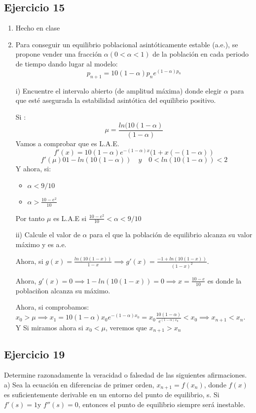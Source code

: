 \documentclass[11pt, a4paper, titlepage]{article}
\theoremstyle{theorem-style}
\theoremstyle{definition-style}
\theoremstyle{remark-style}
\theoremstyle{example-style}
\begin{document}
	\subsection{Ejercicio 15}
	
	\begin{enumerate}
	\item Hecho en clase
	\item Para conseguir un equilibrio poblacional asintóticamente estable (a.e.), se propone vender una fracción $\alpha$$(0 < \alpha < 1)$ de la población en cada periodo de tiempo dando lugar al modelo:
	\[
	p_{n+1} = 10(1 - \alpha)p_n e^{(1-\alpha)p_n}
	\]

	i) Encuentre el intervalo abierto (de amplitud máxima) donde elegir $\alpha$ para que esté asegurada la estabilidad
asintótica del equilibrio positivo.


	Si :
	\[
	\mu = \frac{ln(10(1-\alpha)}{(1-\alpha)}
	\]
Vamos a comprobar que es L.A.E.
\[
f'(x) = 10(1-\alpha)e^{-(1-\alpha)x}(1+x(-(1-\alpha))
\]
\[
f'(\mu) 0 1-ln(10(1-\alpha)) \quad y \quad 0 < ln(10(1-\alpha))< 2
\]
Y ahora, si:
\begin{itemize}
	\item $\alpha < 9/10$
	\item $\alpha > \frac{10-e^2}{10}$
\end{itemize}
Por tanto $\mu$ es L.A.E si $\frac{10-e^2}{10} < \alpha < 9/10$

ii) Calcule el valor de $\alpha$ para el que la población de equilibrio alcanza su valor máximo y es a.e.

Ahora, si $g(x) = \frac{ln(10(1-x))}{1-x}\implies g'(x)= \frac{-1+ln(10(1-x))}{(1-x)^2}$.

Ahora, $g'(x) = 0\implies 1-ln(10(1-x)) = 0 \implies x= \frac{10-e}{10}$ es donde la poblaciñon alcanza su máximo.

Ahora, si comprobamos: $x_0 > \mu \implies x_1 = 10(1-\alpha)x_0 e^{-(1-\alpha)x_0} = x_0 \frac{10(1-\alpha)}{e^{(1-\alpha)x_0}} < x_0 \implies x _{n+1} < x_n$. Y Si miramos ahora si $x_0 < \mu$, veremos que $x _{n+1} > x_n$
\end{enumerate}

\subsection{Ejercicio 19}

Determine razonadamente la veracidad o falsedad de las siguientes afirmaciones.
a) Sea la ecuación en diferencias de primer orden, $x _{n+1} = f (x_n )$, donde $f(x)$ es suficientemente derivable en
un entorno del punto de equilibrio, s. Si $f'(s) = 1 $y $f'' (s) = 0$, entonces el punto de equilibrio siempre será
inestable.
\end{document}
